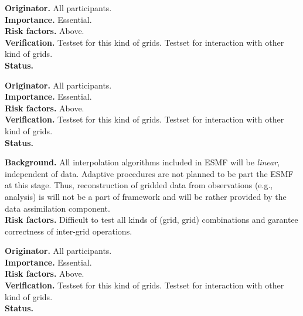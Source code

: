 \begin{reqlist}
{\bf Originator.} All participants. \\
{\bf Importance.} Essential. \\
{\bf Risk factors.} Above. \\
{\bf Verification.} Testset for this kind of grids. Testset for interaction 
with other kind of grids. \\
{\bf Status.} 
\end{reqlist} 
\begin{reqlist}
{\bf Originator.} All participants. \\
{\bf Importance.} Essential. \\
{\bf Risk factors.} Above. \\
{\bf Verification.} Testset for this kind of grids. Testset for interaction 
with other kind of grids. \\
{\bf Status.} 
\end{reqlist} 


\begin{reqlist}
{\bf Background.} All interpolation algorithms included in ESMF will be 
{\it linear}, independent of data. Adaptive procedures are not planned to be 
part the ESMF at this stage. Thus, reconstruction of gridded data from 
observations (e.g., analysis) is will not be a part of framework and will be 
rather provided by the data assimilation component.\\
{\bf Risk factors.} Difficult to test all kinds of (grid, grid) combinations 
and garantee correctness of inter-grid operations.
\end{reqlist}


\begin{reqlist}
{\bf Originator.} All participants. \\
{\bf Importance.} Essential. \\
{\bf Risk factors.} Above. \\
{\bf Verification.} Testset for this kind of grids. Testset for interaction 
with other kind of grids. \\
{\bf Status.} 
\end{reqlist}



